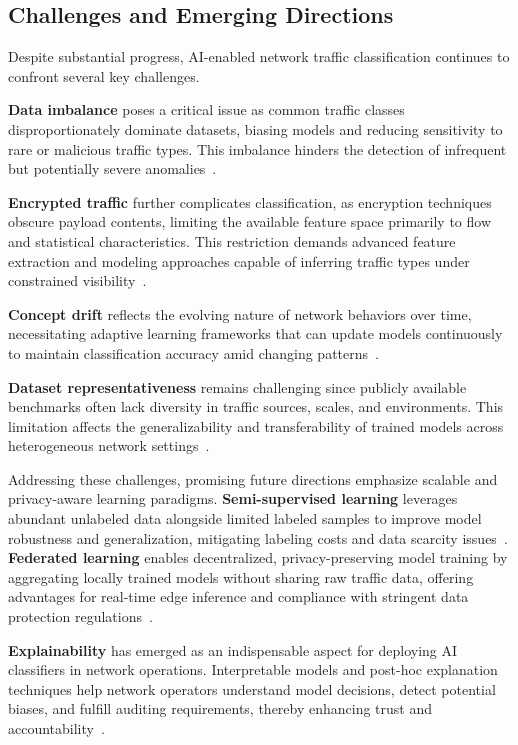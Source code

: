 \documentclass[sigconf]{acmart}
\begin{document}
\subsection{Challenges and Emerging Directions}

Despite substantial progress, AI-enabled network traffic classification continues to confront several key challenges.

\textbf{Data imbalance} poses a critical issue as common traffic classes disproportionately dominate datasets, biasing models and reducing sensitivity to rare or malicious traffic types. This imbalance hinders the detection of infrequent but potentially severe anomalies~\cite{ref51}.

\textbf{Encrypted traffic} further complicates classification, as encryption techniques obscure payload contents, limiting the available feature space primarily to flow and statistical characteristics. This restriction demands advanced feature extraction and modeling approaches capable of inferring traffic types under constrained visibility~\cite{ref51}.

\textbf{Concept drift} reflects the evolving nature of network behaviors over time, necessitating adaptive learning frameworks that can update models continuously to maintain classification accuracy amid changing patterns~\cite{ref51}.

\textbf{Dataset representativeness} remains challenging since publicly available benchmarks often lack diversity in traffic sources, scales, and environments. This limitation affects the generalizability and transferability of trained models across heterogeneous network settings~\cite{ref51}.

Addressing these challenges, promising future directions emphasize scalable and privacy-aware learning paradigms. \textbf{Semi-supervised learning} leverages abundant unlabeled data alongside limited labeled samples to improve model robustness and generalization, mitigating labeling costs and data scarcity issues~\cite{ref50,ref51}. \textbf{Federated learning} enables decentralized, privacy-preserving model training by aggregating locally trained models without sharing raw traffic data, offering advantages for real-time edge inference and compliance with stringent data protection regulations~\cite{ref49,ref50,ref51}.

\textbf{Explainability} has emerged as an indispensable aspect for deploying AI classifiers in network operations. Interpretable models and post-hoc explanation techniques help network operators understand model decisions, detect potential biases, and fulfill auditing requirements, thereby enhancing trust and accountability~\cite{ref50,ref51}.
\end{document}
